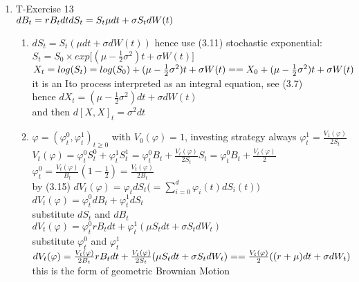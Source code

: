 \documentclass[11pt]{article}
\begin{document}
\begin{enumerate} %
	
\item T-Exercise 13
\\[5pt] $dB_t=rB_t dt 
\\ 	 dS_t=S_t\mu dt+\sigma S_t dW(t)$
	\begin{enumerate} %
		\item $dS_t=S_t(\mu dt+\sigma dW(t))$ hence use (3.11) stochastic exponential: 
		\\[5pt] $S_t=S_0 \times exp \bigg[ (\mu-\frac{1}{2}\sigma^2)t+\sigma W(t) \bigg]$ 
		\\[5pt] $X_t = log(S_t)=log(S_0) + (\mu-\frac{1}{2}\sigma^2)t+\sigma W(t) =
		\\[5pt] =X_0 + (\mu-\frac{1}{2}\sigma^2)t+\sigma W(t)$ 
		\\[5pt] it is an Ito process interpreted as an integral equation, see (3.7)
		\\[5pt] hence $dX_t = (\mu-\frac{1}{2}\sigma^2)dt+\sigma dW(t)$
		\\[5pt] and then $d[X,X]_t = \sigma^2 dt$ 
		\\
		
		\item $\varphi = (\varphi_t^0, \varphi_t^1)_{t\geq 0}$ with $V_0(\varphi)=1$, investing strategy always $\varphi_t^1=\frac{V_1(\varphi)}{2S_t}$ 
		\\[5pt] $V_t (\varphi) = \varphi_t^0 S_t^0 + \varphi_t^1 S_t^1 = \varphi_t^0 B_t + \frac{V_t(\varphi)}{2S_t} S_t = \varphi_t^0 B_t + \frac{V_t(\varphi)}{2} $
		\\[5pt] $\varphi_t^0=\frac{V_t(\varphi)}{B_t}(1- \frac{1}{2})=\frac{V_t(\varphi)}{2B_t}$
		\\[5pt] by (3.15) $dV_t(\varphi)=\varphi_t dS_t \bigg(= \sum_{i=0}^d \varphi_i(t) dS_i(t) \bigg)$
		\\[5pt] $dV_t (\varphi) = \varphi_t^0 dB_t + \varphi_t^1 dS_t$
		\\[5pt] substitute $dS_t$ and $dB_t$
		\\[5pt] $dV_t (\varphi) = \varphi_t^0 rB_t dt + \varphi_t^1 (\mu S_t dt + \sigma S_t dW_t)$
		\\[5pt] substitute $\varphi_t^0$ and $\varphi_t^1$
		\\[5pt] $dV_t(\varphi) = \frac{V_t(\varphi)}{2B_t} rB_t dt + \frac{V_t(\varphi)}{2S_t} (\mu S_t dt + \sigma S_t dW_t)=
		\\[5pt] = \frac{V_t(\varphi)}{2} ((r+\mu)dt + \sigma dW_t)$ 
		\\[5pt] this is the form of geometric Brownian Motion
				
	\end{enumerate}

\end{enumerate}
\end{document}
